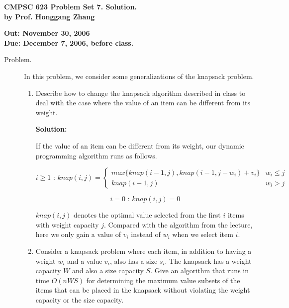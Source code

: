 \documentclass[11pt]{article}
\begin{document}

\begin{center}
{\bf CMPSC 623 Problem Set 7. Solution.} \\
{\bf by Prof. Honggang Zhang} \\
\end{center}
\begin{center}
{\bf Out: November 30, 2006} \\
{\bf Due: December 7, 2006, before class.} \\

\end{center}


\begin{description}

\item[Problem.]

In this problem, we consider some generalizations of the knapsack problem.

\begin{enumerate}
\item Describe how to change the knapsack algorithm described in class to deal with the case where
the value of an item can be different from its weight.

\noindent \textbf{Solution:}

If the value of an item can be different from its weight, our dynamic programming algorithm runs as
follows.

\[i\geq1 \textrm{  :  } knap(i,j)=\left\{\begin{array}{ll} max\{knap(i-1,j),knap(i-1,j-w_i)+v_i\} & w_i\leq j\\ knap(i-1,j) & w_i>j

\end{array}\right.\]

\[i=0 \textrm{  :  } knap(i,j)=0\]

$knap(i,j)$ denotes the optimal value selected from the first $i$ items with weight capacity $j$.
Compared with the algorithm from the lecture, here we only gain a value of $v_i$ instead of $w_i$
when we select item $i$.


\item Consider a knapsack problem where each item, in addition to having a weight $w_i$ and a
value $v_i$, also has a size $s_i$. The knapsack has a weight capacity $W$ and also a size capacity
$S$. Give an algorithm that runs in time $O(nWS)$ for determining the maximum value subsets of the
items that can be placed in the knapsack without violating the weight capacity or the size
capacity.


\end{enumerate}
\end{description}
\end{document}
